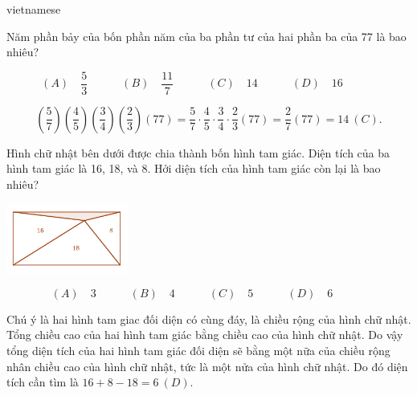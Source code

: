 \documentclass{article}
\begin{document}
\begin{otherlanguage*}{vietnamese}
\bigbreak

\begin{problem*}[PI-2024-C-P23]
    \label{problem:pi-2024-c-p23}

    Năm phần bảy của bốn phần năm của ba phần tư của hai phần ba của 77 là bao nhiêu?

    \[
        (A) \quad \frac{5}{3} \qquad \quad
        (B) \quad \frac{11}{7} \qquad \quad
        (C) \quad 14 \qquad \quad
        (D) \quad 16 \qquad \quad
    \]
\end{problem*}

\begin{soln}
    \[
        \left(\frac{5}{7}\right)\left(\frac{4}{5}\right)\left(\frac{3}{4}\right)\left(\frac{2}{3}\right) (77)
        = \frac{5}{7} \cdot \frac{4}{5} \cdot \frac{3}{4} \cdot \frac{2}{3} (77) = \frac{2}{7} (77) = \boxed{14\ (C).}
    \]
\end{soln}

\newpage

\begin{problem*}[PI-2024-C-P24]
    \label{problem:pi-2024-c-p24}

    Hình chữ nhật bên dưới được chia thành bốn hình tam giác. Diện tích của ba hình tam giác là 16, 18, và 8.
    Hởi diện tích của hình tam giác còn lại là bao nhiêu?

    \begin{center}
        \includegraphics[width=4cm]{./svg/pdf/pi-2024-c-p24.pdf}
    \end{center}

    \[
        (A) \quad 3 \qquad \quad
        (B) \quad 4 \qquad \quad
        (C) \quad 5 \qquad \quad
        (D) \quad 6 \qquad \quad
    \]
\end{problem*}

\begin{soln}
    Chú ý là hai hình tam giac đối diện có cùng đáy, là chiều rộng của hình chữ nhật. Tổng chiều cao của hai hình tam giác bằng chiều cao của hình chữ nhật.
    Do vậy tổng diện tích của hai hình tam giác đối diện sẽ bằng một nữa của chiều rộng nhân chiều cao của hình chữ nhật, tức là một nửa của hình chữ nhật. 
    Do đó diện tích cần tìm là $16 + 8 - 18 = \boxed{6\ (D).}$
\end{soln}


\end{otherlanguage*}
\end{document}
